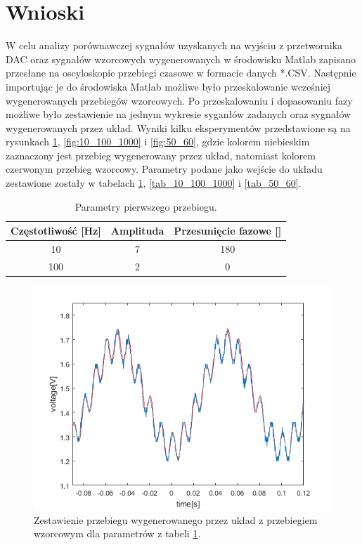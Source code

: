 \section{Wnioski}
\indent W celu analizy porównawczej sygnałów uzyskanych na wyjściu z przetwornika DAC oraz sygnałów wzorcowych wygenerowanych w środowisku Matlab zapisano przesłane na oscyloskopie przebiegi czasowe w formacie danych *.CSV. Następnie importując je do środowiska Matlab możliwe było przeskalowanie wcześniej wygenerowanych przebiegów wzorcowych. Po przeskalowaniu i dopasowaniu fazy możliwe było zestawienie na jednym wykresie syganłów zadanych oraz sygnałów wygenerowanych przez układ. Wyniki kilku eksperymentów przedstawione są na rysunkach \ref{fig:10_100}, \ref{fig:10_100_1000} i \ref{fig:50_60}, gdzie kolorem niebieskim zaznaczony jest przebieg wygenerowany przez układ, natomiast kolorem czerwonym przebieg wzorcowy. Parametry podane jako wejście do układu zestawione zostały w tabelach \ref{tab_10_100}, \ref{tab_10_100_1000} i \ref{tab_50_60}.

\begin{table}[h]
	\caption{Parametry pierwszego przebiegu.}
	\label{tab_10_100}
	\centering
	
	\begin{tabular}{|c|c|c|}
		\hline
		\textbf{Częstotliwość [Hz]} & \textbf{Amplituda} & \textbf{Przesunięcie fazowe [\textdegree]}\\
		\hline
		10 & 7 & 180 \\
		\hline
		100 & 2 & 0 \\
		\hline
	\end{tabular}
\end{table}

\begin{figure}[h!]
	\centering
	\includegraphics[scale = 0.8]{fig/10_100.png}
	\caption		
	{Zestawienie przebiegu wygenerowanego przez układ z przebiegiem wzorcowym dla parametrów z tabeli \ref{tab_10_100}.}
	\label{fig:10_100}
\end{figure}

